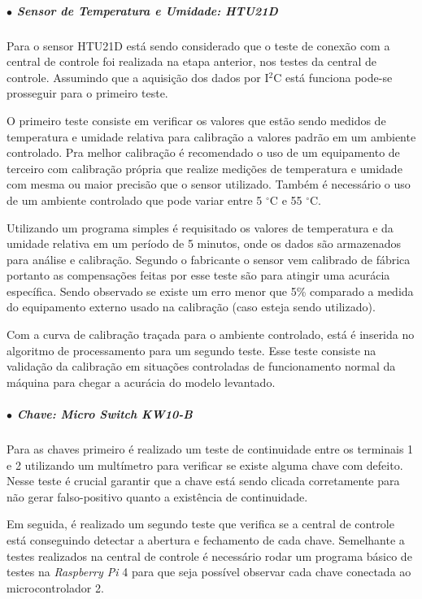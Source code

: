 \subparagraph*{$\bullet$ Sensor de Temperatura e Umidade: HTU21D} \hfill


Para o sensor HTU21D está sendo considerado que o teste de conexão com a central de controle foi realizada na etapa anterior, nos testes da central de controle. Assumindo que a aquisição dos dados por I$^2$C está funciona pode-se prosseguir para o primeiro teste. 

O primeiro teste consiste em verificar os valores que estão sendo medidos de temperatura e umidade relativa para calibração a valores padrão em um ambiente controlado. Pra melhor calibração é recomendado o uso de um equipamento de terceiro com calibração própria que realize medições de temperatura e umidade com mesma ou maior precisão que o sensor utilizado. Também é necessário o uso de um ambiente controlado que pode variar entre 5 $ ^\circ$C e 55 $^\circ$C.

Utilizando um programa simples é requisitado os valores de temperatura e da umidade relativa em um período de 5 minutos, onde os dados são armazenados para análise e calibração. Segundo o fabricante o sensor vem calibrado de fábrica portanto as compensações feitas por esse teste são para atingir uma acurácia específica. Sendo observado se existe um erro menor que 5\% comparado a medida do equipamento externo usado na calibração (caso esteja sendo utilizado).

Com a curva de calibração traçada para o ambiente controlado, está é inserida no algoritmo de processamento para um segundo teste. Esse teste consiste na validação da calibração em situações controladas de funcionamento normal da máquina para chegar a acurácia do modelo levantado. 


\subparagraph*{$\bullet$ Chave: Micro \textit{Switch} KW10-B} \hfill

Para as chaves primeiro é realizado um teste de continuidade entre os terminais 1 e 2 utilizando um multímetro para verificar se existe alguma chave com defeito. Nesse teste é crucial garantir que a chave está sendo clicada corretamente para não gerar falso-positivo quanto a existência de continuidade. 

Em seguida, é realizado um segundo teste que verifica se a central de controle está conseguindo detectar a abertura e fechamento de cada chave. Semelhante a testes realizados na central de controle é necessário rodar um programa básico de testes na \textit{Raspberry Pi} 4 para que seja possível observar cada chave conectada ao microcontrolador 2. 

